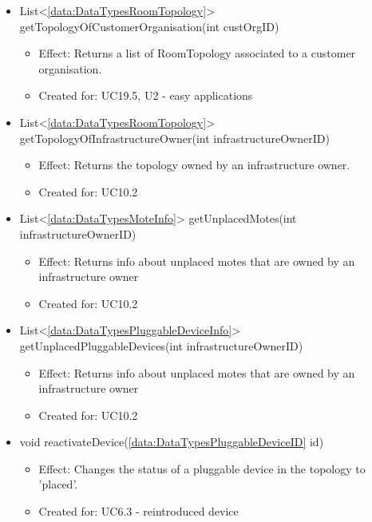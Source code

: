 \begin{description}
\begin{itemize}[noitemsep,nolistsep,leftmargin=-.25cm]
      \item \textsf{List\textless{}\ref{data:DataTypesRoomTopology}\textgreater{} getTopologyOfCustomerOrganisation(int custOrgID)}
        \begin{itemize}[noitemsep,nolistsep]
           \item Effect: Returns a list of RoomTopology associated to a customer organisation.
\item Created for: UC19.5, U2 - easy applications
        \end{itemize}
      \item \textsf{List\textless{}\ref{data:DataTypesRoomTopology}\textgreater{} getTopologyOfInfrastructureOwner(int infrastructureOwnerID)}
        \begin{itemize}[noitemsep,nolistsep]
           \item Effect: Returns the topology owned by an infrastructure owner.
\item Created for: UC10.2
        \end{itemize}
      \item \textsf{List\textless{}\ref{data:DataTypesMoteInfo}\textgreater{} getUnplacedMotes(int infrastructureOwnerID)}
        \begin{itemize}[noitemsep,nolistsep]
           \item Effect: Returns info about unplaced motes that are owned by an infrastructure owner
\item Created for: UC10.2
        \end{itemize}
      \item \textsf{List\textless{}\ref{data:DataTypesPluggableDeviceInfo}\textgreater{} getUnplacedPluggableDevices(int infrastructureOwnerID)}
        \begin{itemize}[noitemsep,nolistsep]
           \item Effect: Returns info about unplaced motes that are owned by an infrastructure owner
\item Created for: UC10.2
        \end{itemize}
      \item \textsf{void reactivateDevice(\ref{data:DataTypesPluggableDeviceID} id)}
        \begin{itemize}[noitemsep,nolistsep]
           \item Effect: Changes the status of a pluggable device in the topology to 'placed'.
\item Created for: UC6.3 - reintroduced device
        \end{itemize}

\end{itemize}
\end{description}
